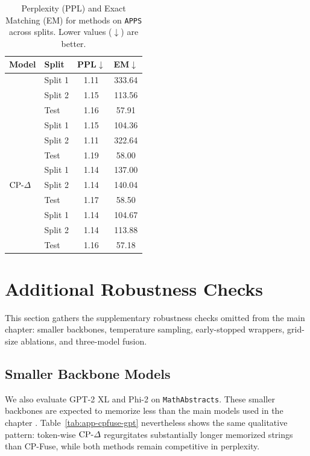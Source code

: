 \begin{table}[!tbp]
\centering
\caption{Perplexity (PPL) and Exact Matching (EM) for methods on \texttt{APPS} across splits. Lower values (\(\downarrow\)) are better.}
\label{tab:app-cpfuse-apps}
\begin{tabular}{llcc}
\toprule
\textbf{Model} & \textbf{Split} & \textbf{PPL}\(\downarrow\) & \textbf{EM}\(\downarrow\) \\
\midrule
{}
& Split 1 & 1.11 & 333.64 \\
& Split 2 & 1.15 & 113.56 \\
& Test    & 1.16 & 57.91 \\
\midrule
{}
& Split 1 & 1.15 & 104.36 \\
& Split 2 & 1.11 & 322.64 \\
& Test    & 1.19 & 58.00 \\
\midrule
{}
& Split 1 & 1.14 & 137.00 \\
& Split 2 & 1.14 & 140.04 \\
& Test    & 1.17 & 58.50 \\
\midrule
{}
& Split 1 & 1.14 & 104.67 \\
& Split 2 & 1.14 & 113.88 \\
& Test    & 1.16 & 57.18 \\
\bottomrule
\end{tabular}
\end{table}

\FloatBarrier
\clearpage

\section{Additional Robustness Checks}
\label{app:cpfuse-variants}

This section gathers the supplementary robustness checks omitted from the main chapter: smaller backbones, temperature sampling, early-stopped wrappers, grid-size ablations, and three-model fusion.

\subsection{Smaller Backbone Models}

We also evaluate GPT-2 XL and Phi-2 \citep{javaheripi2023phi} on \texttt{MathAbstracts}. These smaller backbones are expected to memorize less than the main models used in the chapter \citep{tirumala2022memorization}. Table~\ref{tab:app-cpfuse-gpt} nevertheless shows the same qualitative pattern: token-wise \(\text{CP-}\Delta\) regurgitates substantially longer memorized strings than CP-Fuse, while both methods remain competitive in perplexity.

